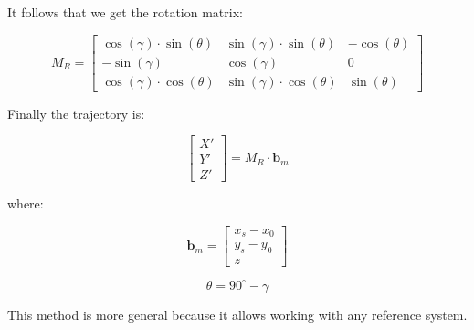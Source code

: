 \documentclass[linenum]{SSA-SRL}
\begin{document}
\begin{flushleft}
\vspace{0.4cm} %

It follows that we get the rotation matrix:

\vspace{0.5cm}

\begin{equation}
M_R = 
\begin{bmatrix}
\cos(\gamma) \cdot \sin(\theta) & \sin(\gamma) \cdot \sin(\theta) & -\cos(\theta) \\
-\sin(\gamma) & \cos(\gamma) & 0 \\
\cos(\gamma) \cdot \cos(\theta) & \sin(\gamma) \cdot \cos(\theta) & \sin(\theta)
\end{bmatrix}
\end{equation}


\vspace{0.4cm}
Finally the trajectory is: 

\begin{equation}
\begin{bmatrix}
X' \\ 
Y' \\ 
Z'
\end{bmatrix}
=
M_R \cdot \mathbf{b}_m
\end{equation}

\vspace{0.4cm} %

where:

\vspace{0.4cm} %

\begin{equation}
\mathbf{b}_m =
\begin{bmatrix}
x_s - x_0 \\
y_s - y_0 \\
z
\end{bmatrix}
\end{equation}

\vspace{0.4cm} %

\begin{equation}
\theta = 90^\circ - \gamma
\end{equation}

This method is more general because it allows working with any reference system. 


\end{flushleft}
\end{document}
